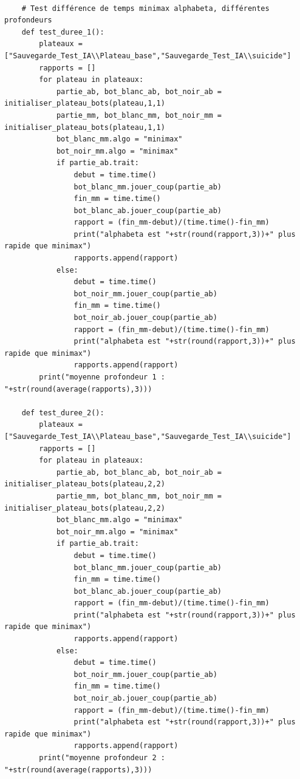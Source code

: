 \documentclass{article}
\begin{document}
\begin{verbatim}

    # Test différence de temps minimax alphabeta, différentes profondeurs
    def test_duree_1():
        plateaux = ["Sauvegarde_Test_IA\\Plateau_base","Sauvegarde_Test_IA\\suicide"]
        rapports = []
        for plateau in plateaux:
            partie_ab, bot_blanc_ab, bot_noir_ab = initialiser_plateau_bots(plateau,1,1)
            partie_mm, bot_blanc_mm, bot_noir_mm = initialiser_plateau_bots(plateau,1,1)
            bot_blanc_mm.algo = "minimax"
            bot_noir_mm.algo = "minimax"
            if partie_ab.trait:
                debut = time.time()
                bot_blanc_mm.jouer_coup(partie_ab)
                fin_mm = time.time()
                bot_blanc_ab.jouer_coup(partie_ab)
                rapport = (fin_mm-debut)/(time.time()-fin_mm)
                print("alphabeta est "+str(round(rapport,3))+" plus rapide que minimax")
                rapports.append(rapport)
            else:
                debut = time.time()
                bot_noir_mm.jouer_coup(partie_ab)
                fin_mm = time.time()
                bot_noir_ab.jouer_coup(partie_ab)
                rapport = (fin_mm-debut)/(time.time()-fin_mm)
                print("alphabeta est "+str(round(rapport,3))+" plus rapide que minimax")
                rapports.append(rapport)
        print("moyenne profondeur 1 : "+str(round(average(rapports),3)))
            
    def test_duree_2():
        plateaux = ["Sauvegarde_Test_IA\\Plateau_base","Sauvegarde_Test_IA\\suicide"]
        rapports = []
        for plateau in plateaux:
            partie_ab, bot_blanc_ab, bot_noir_ab = initialiser_plateau_bots(plateau,2,2)
            partie_mm, bot_blanc_mm, bot_noir_mm = initialiser_plateau_bots(plateau,2,2)
            bot_blanc_mm.algo = "minimax"
            bot_noir_mm.algo = "minimax"
            if partie_ab.trait:
                debut = time.time()
                bot_blanc_mm.jouer_coup(partie_ab)
                fin_mm = time.time()
                bot_blanc_ab.jouer_coup(partie_ab)
                rapport = (fin_mm-debut)/(time.time()-fin_mm)
                print("alphabeta est "+str(round(rapport,3))+" plus rapide que minimax")
                rapports.append(rapport)
            else:
                debut = time.time()
                bot_noir_mm.jouer_coup(partie_ab)
                fin_mm = time.time()
                bot_noir_ab.jouer_coup(partie_ab)
                rapport = (fin_mm-debut)/(time.time()-fin_mm)
                print("alphabeta est "+str(round(rapport,3))+" plus rapide que minimax")
                rapports.append(rapport)
        print("moyenne profondeur 2 : "+str(round(average(rapports),3)))     
        

\end{verbatim}
\end{document}
